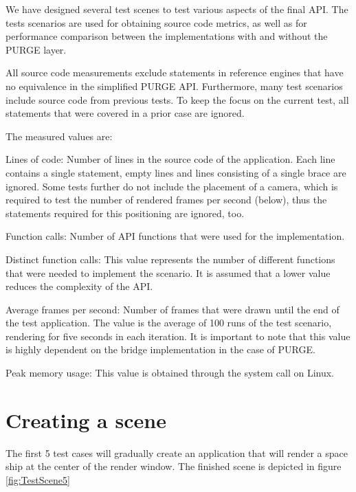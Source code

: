 \label{chapter:evaluation:tests}

We have designed several test scenes to test various aspects of the final API. The tests scenarios are used for obtaining source code metrics, as well as for performance comparison between the implementations with and without the PURGE layer.

All source code measurements exclude statements in reference engines that have no equivalence in the simplified PURGE API. Furthermore, many test scenarios include source code from previous tests. To keep the focus on the current test, all statements that were covered in a prior case are ignored.

The measured values are:

\begin{smalllist}
	\item Lines of code: Number of lines in the source code of the application. Each line contains a single statement, empty lines and lines consisting of a single brace are ignored. Some tests further do not include the placement of a camera, which is required to test the number of rendered frames per second (below), thus the statements required for this positioning are ignored, too.
	\item Function calls: Number of API functions that were used for the implementation.
	\item Distinct function calls: This value represents the number of different functions that were needed to implement the scenario. It is assumed that a lower value reduces the complexity of the API.
	\item Average frames per second: Number of frames that were drawn until the end of the test application. The value is the average of 100 runs of the test scenario, rendering for five seconds in each iteration. It is important to note that this value is highly dependent on the bridge implementation in the case of PURGE.
	\item Peak memory usage: This value is obtained through the  system call on Linux.
\end{smalllist}

\section{Creating a scene}

The first 5 test cases will gradually create an application that will render a space ship at the center of the render window. The finished scene is depicted in figure \ref{fig:TestScene5}

